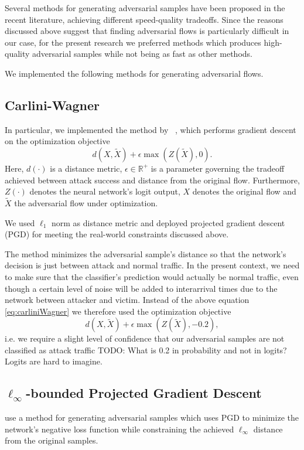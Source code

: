 \documentclass[conference]{IEEEtran}
\newcommand\note[2]{{\color{#1}#2}}
\newcommand\todo[1]{{\note{red}{TODO: #1}}}
\begin{document}
Several methods for generating adversarial samples have been proposed in the recent literature, achieving different speed-quality tradeoffs. Since the reasons discussed above suggest that finding adversarial flows is particularly difficult in our case, for the present research we preferred methods which produces high-quality adversarial samples while not being as fast as other methods.

We implemented the following methods for generating adversarial flows.

\subsection{Carlini-Wagner}
In particular, we implemented the method by \citeauthor{carlini2017towards}~\cite{carlini2017towards}, which performs gradient descent on the optimization objective
\begin{equation} \label{eq:carliniWagner}
d(X,\tilde X) + \epsilon  \max(Z(\tilde X), 0).
\end{equation}
Here, $d(\cdot)$ is a distance metric, $\epsilon \in \mathbb R^+$ is a parameter governing the tradeoff achieved between attack success and distance from the original flow. Furthermore, $Z(\cdot)$ denotes the neural network's logit output, $X$ denotes the original flow and $\tilde X$ the adversarial flow under optimization.

We used $\ell_1$ norm as distance metric and deployed projected gradient descent (PGD) for meeting the real-world constraints discussed above.

The method minimizes the adversarial sample's distance so that the network's decision is just between attack and normal traffic. In the present context, we need to make sure that the classifier's prediction would actually be normal traffic, even though a certain level of noise will be added to interarrival times due to the network between attacker and victim. Instead of the above equation \ref{eq:carliniWagner} we therefore used the optimization objective
\begin{equation}
d(X,\tilde X) + \epsilon  \max(Z(\tilde X), -0.2),
\end{equation}
i.e. we require a slight level of confidence that our adversarial samples are not classified as attack traffic \todo{What is 0.2 in probability and not in logits? Logits are hard to imagine}.

\subsection{$\ell_\infty$-bounded Projected Gradient Descent}
\cite{madry2017towards} use a method for generating adversarial samples which uses PGD  to minimize the network's negative loss function while constraining the achieved $\ell_\infty$ distance from the original samples.
\end{document}
